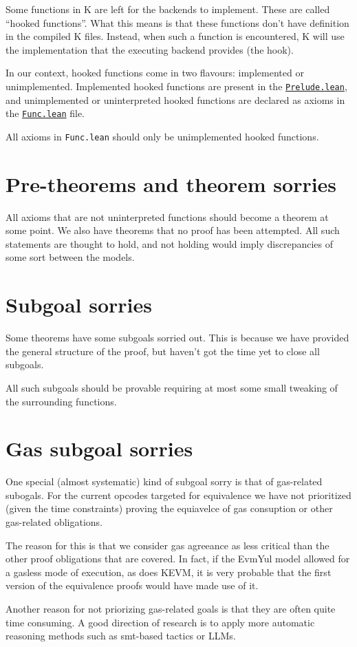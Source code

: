 Some functions in K are left for the backends to implement. These are called
``hooked functions''. What this means is that these functions don't have
definition in the compiled K files. Instead, when such a function is
encountered, K will use the implementation that the executing backend provides
(the hook).

In our context, hooked functions come in two flavours: implemented or
unimplemented. Implemented hooked functions are present in the
\href{https://runtimeverification.github.io/evm-equivalence/docs/EvmEquivalence/KEVM2Lean/Prelude.html}{\texttt{Prelude.lean}},
and unimplemented or uninterpreted hooked functions are declared as axioms in
the
\href{https://runtimeverification.github.io/evm-equivalence/docs/EvmEquivalence/KEVM2Lean/Func.html}{\texttt{Func.lean}}
file.

All axioms in \texttt{Func.lean} should only be unimplemented hooked functions.

\section{Pre-theorems and theorem sorries}

All axioms that are not uninterpreted functions should become a theorem at some
point. We also have theorems that no proof has been attempted. All such
statements are thought to hold, and not holding would imply discrepancies of
some sort between the models.

\section{Subgoal sorries}

Some theorems have some subgoals sorried out. This is because we have
provided the general structure of the proof, but haven't got the time yet to
close all subgoals.

All such subgoals should be provable requiring at most some small tweaking of
the surrounding functions.

\section{Gas subgoal sorries}

One special (almost systematic) kind of subgoal sorry is that of gas-related subogals.
For the current opcodes targeted for equivalence we have not prioritized (given the time constraints) proving the equiavelce of gas consuption or other gas-related obligations.

The reason for this is that we consider gas agreeance as less critical than the other proof obligations that are covered.
In fact, if the EvmYul model allowed for a gasless mode of execution, as does KEVM, it is very probable that the first version of the equivalence proofs would have made use of it.

Another reason for not priorizing gas-related goals is that they are often quite time consuming. A good direction of research is to apply more automatic reasoning methods such as smt-based tactics or LLMs.
